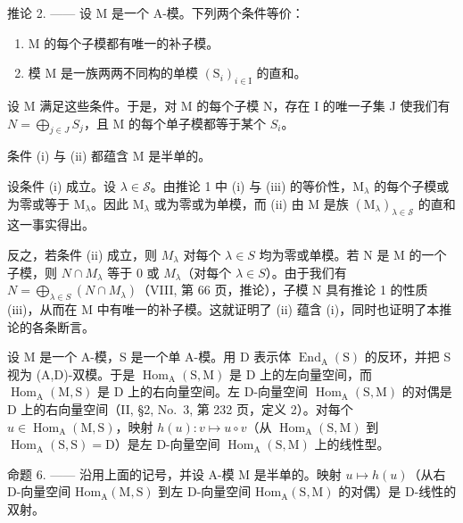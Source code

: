 推论 2. —— 设 M 是一个 A-模。下列两个条件等价：

\begin{enumerate}
\def\labelenumi{(\roman{enumi})}
\item
  M 的每个子模都有唯一的补子模。
\item
  模 M 是一族两两不同构的单模 \((\mathrm{S}_{i})_{i\in\mathrm{I}}\) 的直和。
\end{enumerate}

设 M 满足这些条件。于是，对 M 的每个子模 N，存在 I 的唯一子集 J 使我们有 \(N = \bigoplus_{j \in J} S_j\)，且 M 的每个单子模都等于某个 \(S_i\)。

条件 (i) 与 (ii) 都蕴含 M 是半单的。

设条件 (i) 成立。设 \(\lambda \in \mathcal{S}\)。由推论 1 中 (i) 与 (iii) 的等价性，\(\mathrm{M}_{\lambda}\) 的每个子模或为零或等于 \(\mathrm{M}_{\lambda}\)。因此 \(\mathrm{M}_{\lambda}\) 或为零或为单模，而 (ii) 由 \(\mathrm{M}\) 是族 \((\mathrm{M}_{\lambda})_{\lambda \in \mathcal{S}}\) 的直和这一事实得出。

反之，若条件 (ii) 成立，则 \(M_{\lambda}\) 对每个 \(\lambda \in S\) 均为零或单模。若 N 是 M 的一个子模，则 \(N \cap M_{\lambda}\) 等于 0 或 \(M_{\lambda}\)（对每个 \(\lambda \in S\)）。由于我们有 \(N = \bigoplus_{\lambda \in S} (N \cap M_{\lambda})\)（VIII, 第 66 页，推论），子模 N 具有推论 1 的性质 (iii)，从而在 M 中有唯一的补子模。这就证明了 (ii) 蕴含 (i)，同时也证明了本推论的各条断言。

设 M 是一个 A-模，S 是一个单 A-模。用 D 表示体 \(\operatorname{End}_{\mathrm{A}}(\mathrm{S})\) 的反环，并把 S 视为 (A,D)-双模。于是 \(\operatorname{Hom}_{\mathrm{A}}(\mathrm{S},\mathrm{M})\) 是 D 上的左向量空间，而 \(\operatorname{Hom}_{\mathrm{A}}(\mathrm{M},\mathrm{S})\) 是 D 上的右向量空间。左 D-向量空间 \(\operatorname{Hom}_{\mathrm{A}}(\mathrm{S},\mathrm{M})\) 的对偶是 D 上的右向量空间（II, §2, No.~3, 第 232 页，定义 2）。对每个 \(u \in \operatorname{Hom}_{\mathrm{A}}(\mathrm{M},\mathrm{S})\)，映射 \(h(u): v \mapsto u \circ v\)（从 \(\operatorname{Hom}_{\mathrm{A}}(\mathrm{S},\mathrm{M})\) 到 \(\operatorname{Hom}_{\mathrm{A}}(\mathrm{S},\mathrm{S}) = \mathrm{D}\)）是左 D-向量空间 \(\operatorname{Hom}_{\mathrm{A}}(\mathrm{S},\mathrm{M})\) 上的线性型。

命题 6. —— 沿用上面的记号，并设 A-模 M 是半单的。映射 \(u \mapsto h(u)\)（从右 D-向量空间 \(\mathrm{Hom}_{\mathrm{A}}(\mathrm{M},\mathrm{S})\) 到左 D-向量空间 \(\mathrm{Hom}_{\mathrm{A}}(\mathrm{S},\mathrm{M})\) 的对偶）是 D-线性的双射。

